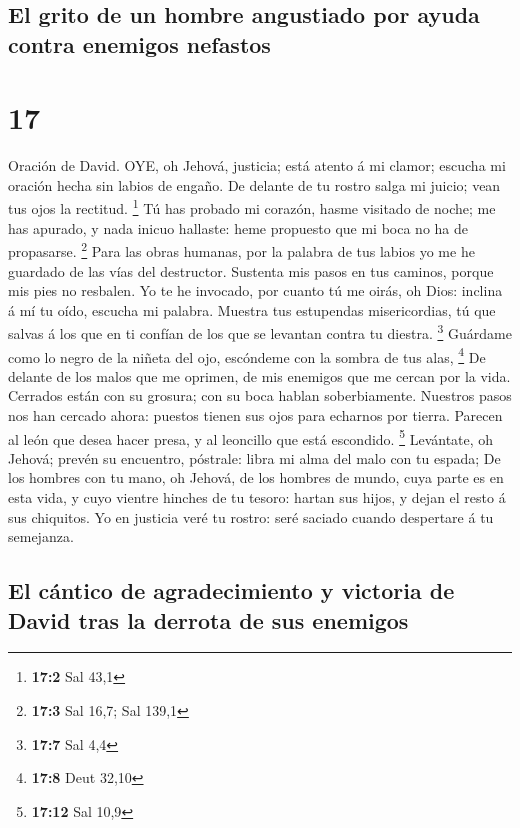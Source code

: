 \hypertarget{el-grito-de-un-hombre-angustiado-por-ayuda-contra-enemigos-nefastos}{%
\subsection{El grito de un hombre angustiado por ayuda contra enemigos
nefastos}\label{el-grito-de-un-hombre-angustiado-por-ayuda-contra-enemigos-nefastos}}

\hypertarget{section-16}{%
\section{17}\label{section-16}}

 Oración de David. OYE, oh Jehová, justicia; está atento á
mi clamor; escucha mi oración hecha sin labios de engaño. 
De delante de tu rostro salga mi juicio; vean tus ojos la rectitud.
\footnote{\textbf{17:2} Sal 43,1}  Tú has probado mi
corazón, hasme visitado de noche; me has apurado, y nada inicuo
hallaste: heme propuesto que mi boca no ha de propasarse. \footnote{\textbf{17:3}
  Sal 16,7; Sal 139,1}  Para las obras humanas, por la
palabra de tus labios yo me he guardado de las vías del destructor.
 Sustenta mis pasos en tus caminos, porque mis pies no
resbalen.  Yo te he invocado, por cuanto tú me oirás, oh
Dios: inclina á mí tu oído, escucha mi palabra.  Muestra tus
estupendas misericordias, tú que salvas á los que en ti confían de los
que se levantan contra tu diestra. \footnote{\textbf{17:7} Sal 4,4}
 Guárdame como lo negro de la niñeta del ojo, escóndeme con
la sombra de tus alas, \footnote{\textbf{17:8} Deut 32,10} 
De delante de los malos que me oprimen, de mis enemigos que me cercan
por la vida.  Cerrados están con su grosura; con su boca
hablan soberbiamente.  Nuestros pasos nos han cercado
ahora: puestos tienen sus ojos para echarnos por tierra. 
Parecen al león que desea hacer presa, y al leoncillo que está
escondido. \footnote{\textbf{17:12} Sal 10,9}  Levántate,
oh Jehová; prevén su encuentro, póstrale: libra mi alma del malo con tu
espada;  De los hombres con tu mano, oh Jehová, de los
hombres de mundo, cuya parte es en esta vida, y cuyo vientre hinches de
tu tesoro: hartan sus hijos, y dejan el resto á sus chiquitos.
 Yo en justicia veré tu rostro: seré saciado cuando
despertare á tu semejanza.

\hypertarget{el-cuxe1ntico-de-agradecimiento-y-victoria-de-david-tras-la-derrota-de-sus-enemigos}{%
\subsection{El cántico de agradecimiento y victoria de David tras la
derrota de sus
enemigos}\label{el-cuxe1ntico-de-agradecimiento-y-victoria-de-david-tras-la-derrota-de-sus-enemigos}}

